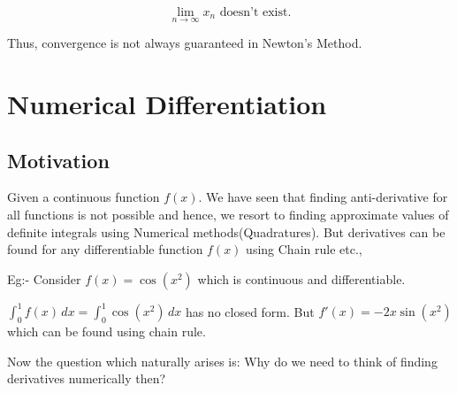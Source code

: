 \documentclass[
]{book}
\begin{document}
\[\lim_{n \to \infty} x_n \text{ doesn't exist.}\]

Thus, convergence is not always guaranteed in Newton's Method.

\hypertarget{numerical-differentiation}{%
\chapter{Numerical Differentiation}\label{numerical-differentiation}}

\hypertarget{motivation-4}{%
\section{Motivation}\label{motivation-4}}

Given a continuous function \(f(x)\). We have seen that finding anti-derivative for all functions is not possible and hence, we resort to finding approximate values of definite integrals using Numerical methods(Quadratures). But derivatives can be found for any differentiable function \(f(x)\) using Chain rule etc.,

Eg:- Consider \(f(x) = \cos(x^2)\) which is continuous and differentiable.

\(\int_0^1 f(x) \, dx = \int_0^1 \cos(x^2)\, dx\) has no closed form. But \(f'(x) = -2x\sin(x^2)\) which can be found using chain rule.

Now the question which naturally arises is: Why do we need to think of finding derivatives numerically then?
\end{document}
